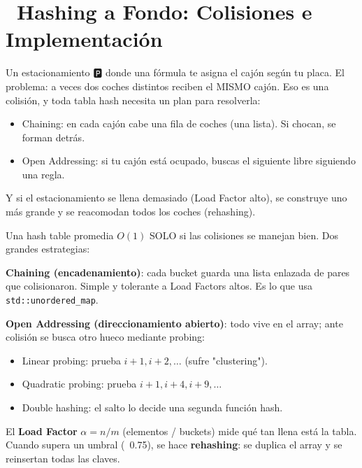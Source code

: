 \chapter[\emj{💥}~Hashing a Fondo: Colisiones e Implementación]{~Hashing a Fondo: Colisiones e Implementación}

\begin{dsaquees}

Un estacionamiento 🅿️ donde una fórmula te asigna el cajón según tu
placa. El problema: a veces dos coches distintos reciben el MISMO cajón.
Eso es una colisión, y toda tabla hash necesita un plan para resolverla:

\begin{itemize}
\item Chaining: en cada cajón cabe una fila de coches (una lista). Si
      chocan, se forman detrás.
\item Open Addressing: si tu cajón está ocupado, buscas el siguiente
      libre siguiendo una regla.
\end{itemize}

Y si el estacionamiento se llena demasiado (Load Factor alto), se
construye uno más grande y se reacomodan todos los coches (rehashing).

\end{dsaquees}

\begin{dsaotraforma}

Una hash table promedia $O(1)$ SOLO si las colisiones se manejan bien.
Dos grandes estrategias:

\textbf{Chaining (encadenamiento)}: cada bucket guarda una lista
enlazada de pares que colisionaron. Simple y tolerante a Load Factors
altos. Es lo que usa \verb|std::unordered_map|.

\textbf{Open Addressing (direccionamiento abierto)}: todo vive en el
array; ante colisión se busca otro hueco mediante probing:
\begin{itemize}
\item Linear probing: prueba $i+1, i+2, \ldots$ (sufre "clustering").
\item Quadratic probing: prueba $i+1, i+4, i+9, \ldots$
\item Double hashing: el salto lo decide una segunda función hash.
\end{itemize}

El \textbf{Load Factor} $\alpha = n/m$ (elementos / buckets) mide qué
tan llena está la tabla. Cuando supera un umbral (~0.75), se hace
\textbf{rehashing}: se duplica el array y se reinsertan todas las claves.

\end{dsaotraforma}

